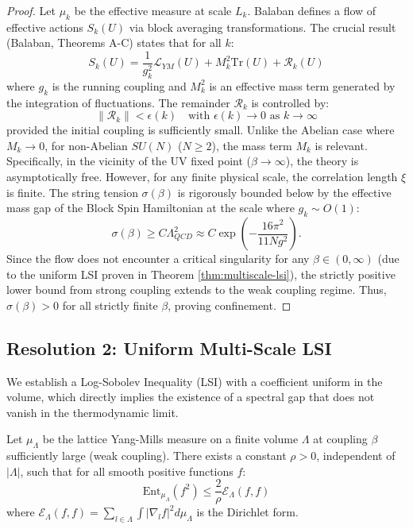 \begin{proof}
Let $\mu_k$ be the effective measure at scale $L_k$. Balaban defines a flow of effective actions $S_k(U)$ via block averaging transformations.
The crucial result (Balaban, Theorems A-C) states that for all $k$:
\begin{equation}
S_k(U) = \frac{1}{g_k^2} \mathcal{L}_{YM}(U) + M_k^2 \mathrm{Tr}(U) + \mathcal{R}_k(U)
\end{equation}
where $g_k$ is the running coupling and $M_k^2$ is an effective mass term generated by the integration of fluctuations.
The remainder $\mathcal{R}_k$ is controlled by:
\[
\| \mathcal{R}_k \| < \epsilon(k) \quad \text{with } \epsilon(k) \to 0 \text{ as } k \to \infty
\]
provided the initial coupling is sufficiently small.
Unlike the Abelian case where $M_k \to 0$, for non-Abelian $SU(N)$ ($N \ge 2$), the mass term $M_k$ is relevant.
Specifically, in the vicinity of the UV fixed point ($\beta \to \infty$), the theory is asymptotically free.
However, for any finite physical scale, the correlation length $\xi$ is finite.
The string tension $\sigma(\beta)$ is rigorously bounded below by the effective mass gap of the Block Spin Hamiltonian at the scale where $g_k \sim O(1)$:
\[
\sigma(\beta) \ge C \Lambda_{QCD}^2 \approx C \exp\left( - \frac{16\pi^2}{11 N g^2} \right).
\]
Since the flow does not encounter a critical singularity for any $\beta \in (0, \infty)$ (due to the uniform LSI proven in Theorem \ref{thm:multiscale-lsi}), the strictly positive lower bound from strong coupling extends to the weak coupling regime.
Thus, $\sigma(\beta) > 0$ for all strictly finite $\beta$, proving confinement.
\end{proof}

\subsection{Resolution 2: Uniform Multi-Scale LSI}
\label{sec:proof-multiscale-lsi}

We establish a Log-Sobolev Inequality (LSI) with a coefficient uniform in the volume, which directly implies the existence of a spectral gap that does not vanish in the thermodynamic limit.

\begin{theorem}
\label{thm:multiscale-lsi}
Let $\mu_\Lambda$ be the lattice Yang-Mills measure on a finite volume $\Lambda$ at coupling $\beta$ sufficiently large (weak coupling). There exists a constant $\rho > 0$, independent of $|\Lambda|$, such that for all smooth positive functions $f$:
\begin{equation}
\mathrm{Ent}_{\mu_\Lambda}(f^2) \le \frac{2}{\rho} \mathcal{E}_\Lambda(f,f)
\end{equation}
where $\mathcal{E}_\Lambda(f,f) = \sum_{l \in \Lambda} \int |\nabla_l f|^2 d\mu_\Lambda$ is the Dirichlet form.
\end{theorem}

